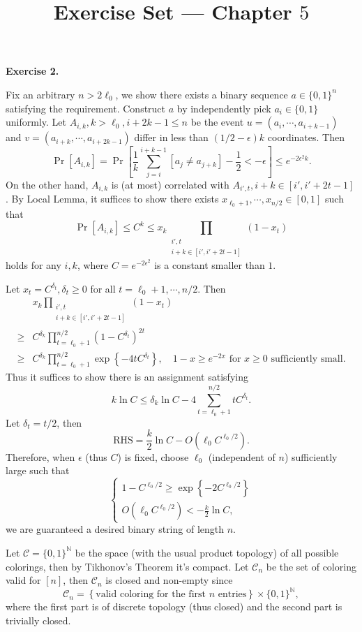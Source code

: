 \documentclass[a4paper]{article}
\title{Exercise Set --- Chapter $5$}
\date{}
\newenvironment{exercise}[1]{
	\par
	\noindent\textbf{Exercise #1.}\quad
}{
	\par
	\bigskip
}
\newcommand{\pbra}[1]{\left( #1 \right)}
\newcommand{\cbra}[1]{\left\{ #1 \right\}}
\newcommand{\sbra}[1]{\left[ #1 \right]}
\newcommand{\bin}{\{0,1\}}
\newcommand{\Nbb}{\mathbb{N}}
\newcommand{\Ccal}{\mathcal{C}}
\begin{document}
\maketitle

\begin{exercise}{2}
    Fix an arbitrary $n>2\ell_0$, we show there exists a binary sequence $a\in\bin^n$ satisfying the requirement.
    Construct $a$ by independently pick $a_i\in\bin$ uniformly.
    Let $A_{i,k},k>\ell_0,i+2k-1\leq n$ be the event $u=(a_i,\cdots,a_{i+k-1})$ and $v=(a_{i+k},\cdots,a_{i+2k-1})$
    differ in less than $(1/2-\epsilon)k$ coordinates.
    Then
    $$
    \Pr\sbra{A_{i,k}}=\Pr\sbra{\frac1k\sum_{j=i}^{i+k-1}[a_j\neq a_{j+k}]-\frac12<-\epsilon}
    \leq e^{-2\epsilon^2k}.
    $$
    On the other hand, $A_{i,k}$ is (at most) correlated with $A_{i',t},i+k\in[i',i'+2t-1]$.
    By Local Lemma, it suffices to show there exists $x_{\ell_0+1},\cdots,x_{n/2}\in[0,1]$ such that
    $$
    \Pr\sbra{A_{i,k}}\leq C^k\leq x_k\prod_{\substack{i',t\\i+k\in[i',i'+2t-1]}}(1-x_t)
    $$
    holds for any $i,k$, where $C=e^{-2\epsilon^2}$ is a constant smaller than $1$.

    Let $x_t=C^{\delta_t},\delta_t\geq0$ for all $t=\ell_0+1,\cdots,n/2$.
    Then
    \begin{align*}
        &x_k\prod_{\substack{i',t\\i+k\in[i',i'+2t-1]}}(1-x_t)\\
        \geq&C^{\delta_k}\prod_{t=\ell_0+1}^{n/2}\pbra{1-C^{\delta_t}}^{2t}\\
        \geq&C^{\delta_k}\prod_{t=\ell_0+1}^{n/2}\exp\cbra{-4tC^{\delta_t}},\quad 1-x\geq e^{-2x}
        \text{ for $x\geq0$ sufficiently small.}
    \end{align*}
    Thus it suffices to show there is an assignment satisfying
    $$
        k\ln C\leq\delta_k\ln C-4\sum_{t=\ell_0+1}^{n/2}tC^{\delta_t}.
    $$
    Let $\delta_t=t/2$, then
    $$
    \text{RHS}=\frac k2\ln C-O(\ell_0C^{\ell_0/2}).
    $$
    Therefore, when $\epsilon$ (thus $C$) is fixed, choose $\ell_0$ (independent of $n$) sufficiently large such that
    $$
    \begin{cases}
        1-C^{\ell_0/2}\geq\exp\cbra{-2C^{\ell_0/2}}\\
        O(\ell_0C^{\ell_0/2})<-\frac k2\ln C,
    \end{cases}
    $$
    we are guaranteed a desired binary string of length $n$.

    Let $\Ccal=\bin^{\Nbb}$ be the space (with the usual product topology) of all possible colorings, 
    then by Tikhonov's Theorem it's compact.
    Let $\Ccal_n$ be the set of coloring valid for $[n]$, then $\Ccal_n$ is closed and non-empty since 
    $$
    \Ccal_n=\cbra{\text{valid coloring for the first $n$ entries}}\times\bin^{\Nbb},
    $$
    where the first part is of discrete topology (thus closed) and the second part is trivially closed.


\end{exercise}
\end{document}
